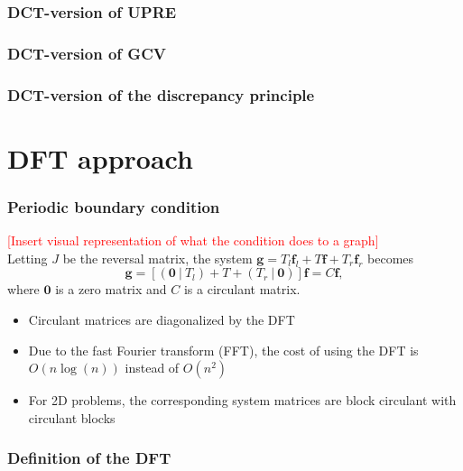 \documentclass{beamer}
\newcommand{\ToDo}[1]{\textcolor{red}{[#1]}}
\newcommand{\gVec}{\mathbf{g}}	%
\newcommand{\fVec}{\mathbf{f}}	%
\begin{document}
\begin{frame}
\frametitle{DCT-version of UPRE}

\end{frame}

\begin{frame}
\frametitle{DCT-version of GCV}

\end{frame}

\begin{frame}
\frametitle{DCT-version of the discrepancy principle}

\end{frame}

\section{DFT approach}

\begin{frame}
\frametitle{Periodic boundary condition}
\ToDo{Insert visual representation of what the condition does to a graph} \\
Letting $J$ be the reversal matrix, the system $\gVec = T_{l}\fVec_{l} + T\fVec + T_{r}\fVec_{r}$ becomes
\[\gVec = [(\mathbf{0}~|~T_{l}) + T + (T_{r}~|~\mathbf{0})]\fVec = C\fVec,\]
where $\mathbf{0}$ is a zero matrix and $C$ is a circulant matrix.
\begin{itemize}
\item Circulant matrices are diagonalized by the DFT
\item Due to the fast Fourier transform (FFT), the cost of using the DFT is $O(n\log(n))$ instead of $O(n^2)$ \cite{CooleyTukey}
\item For 2D problems, the corresponding system matrices are block circulant with circulant blocks
\end{itemize}
\end{frame}

\begin{frame}
\frametitle{Definition of the DFT}

\end{frame}
\end{document}
